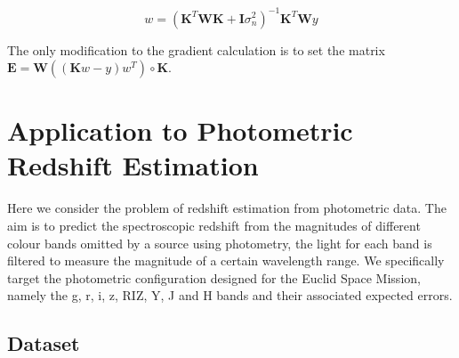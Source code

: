 \documentclass[useAMS,usenatbib,fleqn]{mn2e}
\newcommand{\bm}[1]{\mathbf{#1} }
\begin{document}
\begin{equation}
\label{eq-weighted-linear-regression-objective-rectangular}
w = \left(\bm{K}^{T}\bm{WK}+\bm{I}\sigma_{n}^{2} \right)^{-1}\bm{K}^{T}\bm{W}y
\end{equation}

The only modification to the gradient calculation is to set the matrix $\bm{E}=\bm{W}\left(\left(\bm{K}w-y\right)w^{T}\right)\circ\bm{K}$.

\section{Application to Photometric Redshift Estimation}
\label{sec-application}

Here we consider the problem of redshift estimation from photometric data. The aim is to predict the spectroscopic redshift from the magnitudes of different colour bands omitted by a source using photometry, the light for each band is filtered to measure the magnitude of a certain wavelength range. We specifically target the photometric configuration designed for the Euclid Space Mission, namely the g, r, i, z, RIZ, Y, J and H bands and their associated expected errors.

\subsection{Dataset}
\label{sec-dataset}
\end{document}
